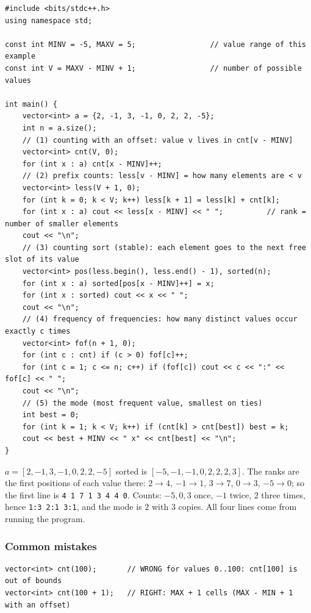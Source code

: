 \begin{lstlisting}[style=cpp]
#include <bits/stdc++.h>
using namespace std;

const int MINV = -5, MAXV = 5;                 // value range of this example
const int V = MAXV - MINV + 1;                 // number of possible values

int main() {
    vector<int> a = {2, -1, 3, -1, 0, 2, 2, -5};
    int n = a.size();
    // (1) counting with an offset: value v lives in cnt[v - MINV]
    vector<int> cnt(V, 0);
    for (int x : a) cnt[x - MINV]++;
    // (2) prefix counts: less[v - MINV] = how many elements are < v
    vector<int> less(V + 1, 0);
    for (int k = 0; k < V; k++) less[k + 1] = less[k] + cnt[k];
    for (int x : a) cout << less[x - MINV] << " ";          // rank = number of smaller elements
    cout << "\n";
    // (3) counting sort (stable): each element goes to the next free slot of its value
    vector<int> pos(less.begin(), less.end() - 1), sorted(n);
    for (int x : a) sorted[pos[x - MINV]++] = x;
    for (int x : sorted) cout << x << " ";
    cout << "\n";
    // (4) frequency of frequencies: how many distinct values occur exactly c times
    vector<int> fof(n + 1, 0);
    for (int c : cnt) if (c > 0) fof[c]++;
    for (int c = 1; c <= n; c++) if (fof[c]) cout << c << ":" << fof[c] << " ";
    cout << "\n";
    // (5) the mode (most frequent value, smallest on ties)
    int best = 0;
    for (int k = 1; k < V; k++) if (cnt[k] > cnt[best]) best = k;
    cout << best + MINV << " x" << cnt[best] << "\n";
}
\end{lstlisting}

\begin{insightbox}
$a = [2,-1,3,-1,0,2,2,-5]$ sorted is $[-5,-1,-1,0,2,2,2,3]$. The ranks are the first positions of each value there: $2 \to 4$, $-1 \to 1$, $3 \to 7$, $0 \to 3$, $-5 \to 0$; so the first line is \texttt{4 1 7 1 3 4 4 0}. Counts: $-5, 0, 3$ once, $-1$ twice, $2$ three times, hence \texttt{1:3 2:1 3:1}, and the mode is $2$ with 3 copies. All four lines come from running the program.
\end{insightbox}

\subsubsection*{Common mistakes}

\begin{warningbox}
\begin{lstlisting}[style=snippet]
vector<int> cnt(100);       // WRONG for values 0..100: cnt[100] is out of bounds
vector<int> cnt(100 + 1);   // RIGHT: MAX + 1 cells (MAX - MIN + 1 with an offset)
\end{lstlisting}
\end{warningbox}


